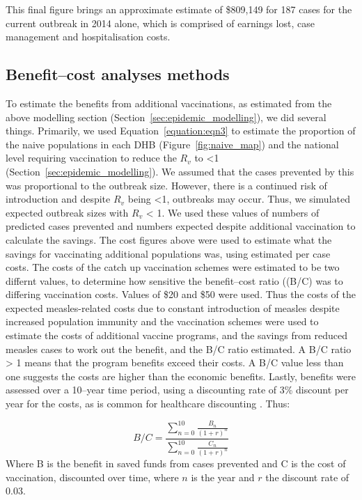 \documentclass{article}
\begin{document}
This final figure brings an approximate estimate of \$809,149 for 187 cases for the current outbreak in 2014 alone, which is comprised of earnings lost, case management and hospitalisation costs.

\subsection{Benefit--cost analyses methods}
\label{sub:cost_benefit}

To estimate the benefits from additional vaccinations, as estimated from the above modelling section (Section~\ref{sec:epidemic_modelling}), we did several things. Primarily, we used Equation~\ref{equation:eqn3} to estimate the proportion of the naive populations in each DHB (Figure~\ref{fig:naive_map}) and the national level requiring vaccination to reduce the $R_v$ to <1 (Section~\ref{sec:epidemic_modelling}). We assumed that the cases prevented by this was proportional to the outbreak size. However, there is a continued risk of introduction and despite $R_v$ being <1, outbreaks may occur. Thus, we simulated expected outbreak sizes with $R_v$ < 1. We used these values of numbers of predicted cases prevented and numbers expected despite additional vaccination to calculate the savings. The cost figures above were used to estimate what the savings for vaccinating additional populations was, using estimated per case costs. The costs of the catch up vaccination schemes were estimated to be two differnt values, to determine how sensitive the benefit--cost ratio ((B/C) was to differing vaccination costs. Values of \$20 and \$50 were used. Thus the costs of the expected measles-related costs due to constant introduction of measles despite increased population immunity and the vaccination schemes were used to estimate the costs of additional vaccine programs, and the savings from reduced measles cases to work out the benefit, and the B/C ratio estimated. A B/C ratio > 1 means that the program benefits exceed their costs. A B/C value less than one suggests the costs are higher than the economic benefits. Lastly, benefits were assessed over a 10--year time period, using a discounting rate of 3\% discount per year for the costs, as is common for healthcare discounting \citep{honeycutt6}. Thus:

\begin{equation} \label{eq:bc}
 \textit{B/C} = \frac{\sum\limits_{n=0}^{10} \frac{B_n}{(1+r)^n}}{\sum\limits_{n=0}^{10} \frac{C_n}{(1+r)^n}}
 \end{equation}
Where B is the benefit in saved funds from cases prevented and C is the cost of vaccination, discounted over time, where $n$ is the year and $r$ the discount rate of 0.03.
\end{document}
